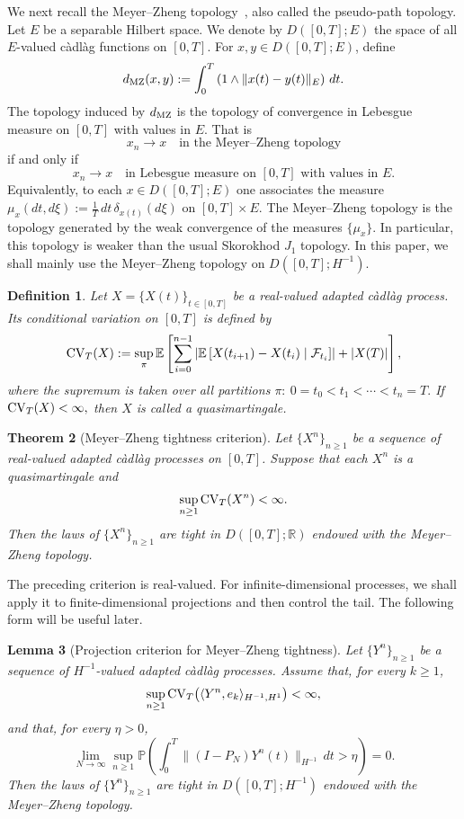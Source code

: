 \documentclass[11pt]{article}
\theoremstyle{plain}
\newtheorem{theorem}{Theorem}[section]
\newtheorem{lemma}[theorem]{Lemma}
\newtheorem{definition}[theorem]{Definition}
\numberwithin{equation}{section}
\begin{document}
We next recall the Meyer--Zheng topology~\cite{BlathHammerOrtgiese2016,MeyerZheng1984}, also called the pseudo-path
topology. Let \(E\) be a separable Hilbert space. We denote by
\(D([0,T];E)\) the space of all \(E\)-valued c\`adl\`ag functions on
\([0,T]\). For \(x,y\in D([0,T];E)\), define
\[
d_{\rm MZ}(x,y):=\int_0^T\left(1\wedge\|x(t)-y(t)\|_E\right)\,dt .
\]
The topology induced by \(d_{\rm MZ}\) is the topology of convergence in
Lebesgue measure on \([0,T]\) with values in \(E\). That is
\[
x_n\to x \quad\text{in the Meyer--Zheng topology}
\]
if and only if
\[
x_n\to x \quad\text{in Lebesgue measure on }[0,T]\text{ with values in }E.
\]
Equivalently, to each \(x\in D([0,T];E)\) one associates the measure
\(\mu_x(dt,d\xi):=\frac1T\,dt\,\delta_{x(t)}(d\xi)\) on \([0,T]\times E\). The Meyer--Zheng topology is the topology generated
by the weak convergence of the measures \(\{\mu_x\}\). In particular, this topology is weaker than the usual Skorokhod \(J_1\) topology.
In this paper, we shall mainly use the Meyer--Zheng topology on \(D([0,T];H^{-1}).\)

\begin{definition}
Let \(X=\{X(t)\}_{t\in[0,T]}\) be a real-valued adapted c\`adl\`ag process.
Its conditional variation on \([0,T]\) is defined by
\[
{\rm CV}_T(X):=\sup_{\pi}\mathbb E\left[\sum_{i=0}^{n-1}\left|\mathbb E\left[X(t_{i+1})-X(t_i)\mid\mathcal F_{t_i}\right]\right|+|X(T)|\right],
\]
where the supremum is taken over all partitions \(\pi:~ 0=t_0<t_1<\cdots<t_n=T.\) If \({\rm CV}_T(X)<\infty,\) then \(X\) is called a quasimartingale.
\end{definition}

\begin{theorem}[Meyer--Zheng tightness criterion]\label{thm:MZ-tightness}
Let \(\{X^n\}_{n\ge1}\) be a sequence of real-valued adapted c\`adl\`ag
processes on \([0,T]\). Suppose that each \(X^n\) is a quasimartingale and
\[
\sup_{n\ge1}{\rm CV}_T(X^n)<\infty.
\]
Then the laws of \(\{X^n\}_{n\ge1}\) are tight in
\(D([0,T];\mathbb R)\) endowed with the Meyer--Zheng topology.
\end{theorem}

The preceding criterion is real-valued. For infinite-dimensional
processes, we shall apply it to finite-dimensional projections and then
control the  tail. The following form will be useful later.

\begin{lemma}[Projection criterion for Meyer--Zheng tightness]
\label{lem:MZ-projection-tightness}
Let \(\{Y^n\}_{n\ge1}\) be a sequence of \(H^{-1}\)-valued adapted c\`adl\`ag processes. Assume that, for every \(k\ge1\),
\[
\sup_{n\ge1}{\rm CV}_T\bigl(\langle Y^n,e_k\rangle_{H^{-1},H^1}\bigr)<\infty,
\]
and that, for every \(\eta>0\),
\[
\lim_{N\to\infty}\sup_{n\ge1}\mathbb P\left(\int_0^T\|(I-P_N)Y^n(t)\|_{H^{-1}}\,dt>\eta\right)=0.
\]
Then the laws of \(\{Y^n\}_{n\ge1}\) are tight in \(D([0,T];H^{-1})\) endowed with the Meyer--Zheng topology.
\end{lemma}
\end{document}
